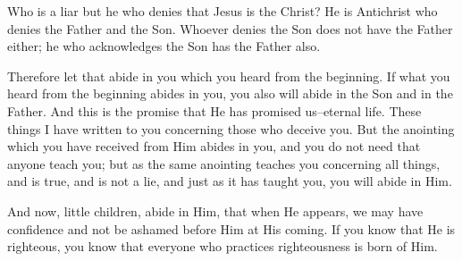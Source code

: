 \bverse Who is a liar but he who denies that Jesus is the Christ? He is Antichrist who denies the Father and the Son.
\bverse Whoever denies the Son does not have the Father either; he who acknowledges the Son has the Father also.


\bverse Therefore let that abide in you which you heard from the beginning. If what you heard from the beginning abides in you, you also will abide in the Son and in the Father.
\bverse And this is the promise that He has promised us--eternal life.
\bverse These things I have written to you concerning those who  deceive you.
\bverse But the anointing which you have received from Him abides in you, and you do not need that anyone teach you; but as the same anointing teaches you concerning all things, and is true, and is not a lie, and just as it has taught you, you will abide in Him.


\bverse And now, little children, abide in Him, that when He appears, we may have confidence and not be ashamed before Him at His coming.
\bverse If you know that He is righteous, you know that everyone who practices righteousness is born of Him.
